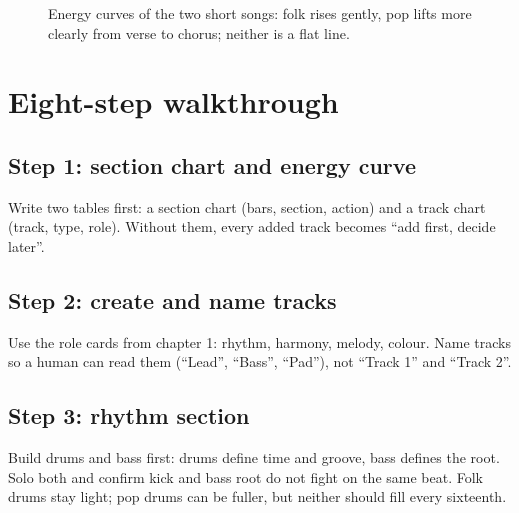 \begin{figure}[htbp]
  \centering
  \caption{Energy curves of the two short songs: folk rises gently, pop lifts more clearly from verse to chorus; neither is a flat line.}
  \label{fig:walkthrough-energy}
\end{figure}

\section{Eight-step walkthrough}
\label{sec:walkthrough-steps}

\subsection*{Step 1: section chart and energy curve}
Write two tables first: a section chart (bars, section, action) and a track chart (track, type, role). Without them, every added track becomes ``add first, decide later''.

\subsection*{Step 2: create and name tracks}
Use the role cards from chapter 1: rhythm, harmony, melody, colour. Name tracks so a human can read them (``Lead'', ``Bass'', ``Pad''), not ``Track 1'' and ``Track 2''.

\subsection*{Step 3: rhythm section}
Build drums and bass first: drums define time and groove, bass defines the root. Solo both and confirm kick and bass root do not fight on the same beat. Folk drums stay light; pop drums can be fuller, but neither should fill every sixteenth.

